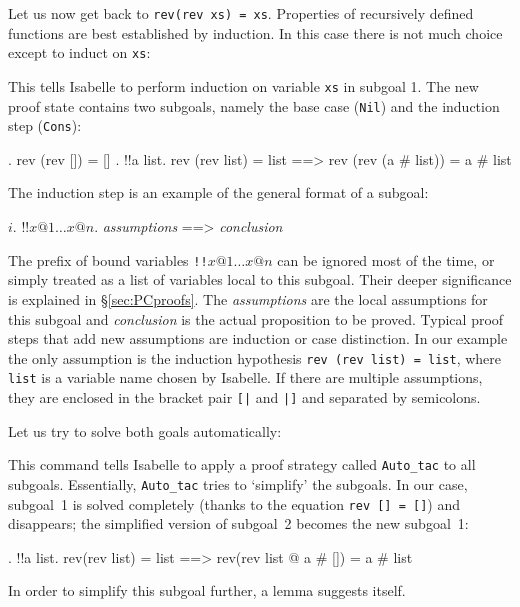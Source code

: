 Let us now get back to \texttt{rev(rev xs) = xs}. Properties of recursively
defined functions are best established by induction. In this case there is
not much choice except to induct on \texttt{xs}:
\begin{ttbox}
\end{ttbox}
This tells Isabelle to perform induction on variable \texttt{xs} in subgoal
1. The new proof state contains two subgoals, namely the base case
(\texttt{Nil}) and the induction step (\texttt{Cons}):
\begin{ttbox}
{. rev (rev []) = []}
{. !!a list. rev (rev list) = list ==> rev (rev (a # list)) = a # list}
\end{ttbox}
The induction step is an example of the general format of a subgoal:
\begin{ttbox}
{\out  \(i\). !!\(x@1 \dots x@n\). {\it assumptions} ==> {\it conclusion}}
\end{ttbox}
The prefix of bound variables \texttt{!!\(x@1 \dots x@n\)} can be ignored
most of the time, or simply treated as a list of variables local to this
subgoal. Their deeper significance is explained in \S\ref{sec:PCproofs}.  The
{\it assumptions} are the local assumptions for this subgoal and {\it
  conclusion} is the actual proposition to be proved. Typical proof steps
that add new assumptions are induction or case distinction. In our example
the only assumption is the induction hypothesis \texttt{rev (rev list) =
  list}, where \texttt{list} is a variable name chosen by Isabelle. If there
are multiple assumptions, they are enclosed in the bracket pair
\texttt{[|} and \texttt{|]}
and separated by semicolons.

Let us try to solve both goals automatically:
\begin{ttbox}
\end{ttbox}
This command tells Isabelle to apply a proof strategy called
\texttt{Auto_tac} to all subgoals. Essentially, \texttt{Auto_tac} tries to
`simplify' the subgoals.  In our case, subgoal~1 is solved completely (thanks
to the equation \texttt{rev [] = []}) and disappears; the simplified version
of subgoal~2 becomes the new subgoal~1:
\begin{ttbox}\makeatother
{. !!a list. rev(rev list) = list ==> rev(rev list @ a # []) = a # list}
\end{ttbox}
In order to simplify this subgoal further, a lemma suggests itself.

